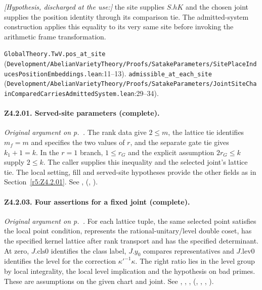 \textit{[Hypothesis, discharged at the use:]} the site supplies $S.hK$ and the chosen joint supplies the position identity through its comparison tie. The admitted-system construction applies this equality to its very same site before invoking the arithmetic frame transformation.
\par{\footnotesize \nolinkurl{GlobalTheory.TwV.pos_at_site} (\nolinkurl{Development/AbelianVarietyTheory/Proofs/SatakeParameters/SitePlaceInducesPositionEmbeddings.lean}\allowbreak:11--13). \nolinkurl{admissible_at_each_site} (\nolinkurl{Development/AbelianVarietyTheory/Proofs/SatakeParameters/JointSiteChainComparedCarriesAdmittedSystem.lean}\allowbreak:29--34).\par}

\paragraph{Z4.2.01. Served-site parameters (complete).}\label{r6:review:Z4.2.01} \emph{Original argument on p.~\pageref{r5:Z4.2.01}.} 
The rank data give $2\le m$, the lattice tie identifies $m_f=m$ and specifies the two values of $r$, and the separate gate tie gives $k_1+1=k$. In the $r=1$ branch, $1\le r_G$ and the explicit assumption $2r_G\le k$ supply $2\le k$. The caller supplies this inequality and the selected joint's lattice tie. The local setting, fill and served-site hypotheses provide the other fields as in Section~\ref{r5:Z4.2.01}.
See ,  (, ).

\paragraph{Z4.2.03. Four assertions for a fixed joint (complete).}\label{r6:review:Z4.2.03} \emph{Original argument on p.~\pageref{r5:small:Z4.2.03}.} 
For each lattice tuple, the same selected point satisfies the local point condition, represents the rational-unitary/level double coset, has the specified kernel lattice after rank transport and has the specified determinant. At zero, $J.\mathrm{cls0}$ identifies the class label, $J.y_0$ compares representatives and $J.\mathrm{lev0}$ identifies the level for the correction $\kappa'^{-1}\kappa$. The right ratio lies in the level group by local integrality, the local level implication and the hypothesis on bad primes. These are assumptions on the given chart and joint.
See , , ,  (, , , ).

